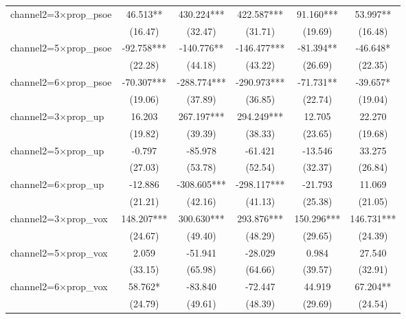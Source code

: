 \begin{tabular}{l*{5}{c}}
channel2=3$\times$prop\_psoe&      46.513** &     430.224***&     422.587***&      91.160***&      53.997** \\
                    &     (16.47)   &     (32.47)   &     (31.71)   &     (19.69)   &     (16.48)   \\
channel2=5$\times$prop\_psoe&     -92.758***&    -140.776** &    -146.477***&     -81.394** &     -46.648*  \\
                    &     (22.28)   &     (44.18)   &     (43.22)   &     (26.69)   &     (22.35)   \\
channel2=6$\times$prop\_psoe&     -70.307***&    -288.774***&    -290.973***&     -71.731** &     -39.657*  \\
                    &     (19.06)   &     (37.89)   &     (36.85)   &     (22.74)   &     (19.04)   \\
channel2=3$\times$prop\_up&      16.203   &     267.197***&     294.249***&      12.705   &      22.270   \\
                    &     (19.82)   &     (39.39)   &     (38.33)   &     (23.65)   &     (19.68)   \\
channel2=5$\times$prop\_up&      -0.797   &     -85.978   &     -61.421   &     -13.546   &      33.275   \\
                    &     (27.03)   &     (53.78)   &     (52.54)   &     (32.37)   &     (26.84)   \\
channel2=6$\times$prop\_up&     -12.886   &    -308.605***&    -298.117***&     -21.793   &      11.069   \\
                    &     (21.21)   &     (42.16)   &     (41.13)   &     (25.38)   &     (21.05)   \\
channel2=3$\times$prop\_vox&     148.207***&     300.630***&     293.876***&     150.296***&     146.731***\\
                    &     (24.67)   &     (49.40)   &     (48.29)   &     (29.65)   &     (24.39)   \\
channel2=5$\times$prop\_vox&       2.059   &     -51.941   &     -28.029   &       0.984   &      27.540   \\
                    &     (33.15)   &     (65.98)   &     (64.66)   &     (39.57)   &     (32.91)   \\
channel2=6$\times$prop\_vox&      58.762*  &     -83.840   &     -72.447   &      44.919   &      67.204** \\
                    &     (24.79)   &     (49.61)   &     (48.39)   &     (29.69)   &     (24.54)   \\

\end{tabular}
